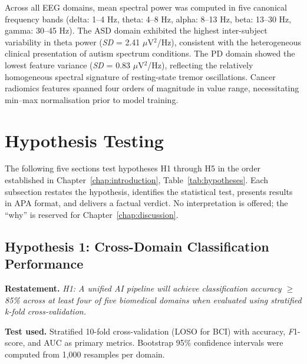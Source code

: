 Across all EEG domains, mean spectral power was computed in five canonical frequency bands (delta: 1--4 Hz, theta: 4--8 Hz, alpha: 8--13 Hz, beta: 13--30 Hz, gamma: 30--45 Hz). The ASD domain exhibited the highest inter-subject variability in theta power (\textit{SD} = 2.41 $\mu$V$^2$/Hz), consistent with the heterogeneous clinical presentation of autism spectrum conditions. The PD domain showed the lowest feature variance (\textit{SD} = 0.83 $\mu$V$^2$/Hz), reflecting the relatively homogeneous spectral signature of resting-state tremor oscillations. Cancer radiomics features spanned four orders of magnitude in value range, necessitating min--max normalisation prior to model training.


\section{Hypothesis Testing}
\label{sec:hypothesis_testing}

The following five sections test hypotheses H1 through H5 in the order established in Chapter~\ref{chap:introduction}, Table~\ref{tab:hypotheses}. Each subsection restates the hypothesis, identifies the statistical test, presents results in APA format, and delivers a factual verdict. No interpretation is offered; the ``why'' is reserved for Chapter~\ref{chap:discussion}.


\subsection{Hypothesis 1: Cross-Domain Classification Performance}
\label{sec:h1_testing}

\textbf{Restatement.} \textit{H1: A unified AI pipeline will achieve classification accuracy $\geq$85\% across at least four of five biomedical domains when evaluated using stratified \textit{k}-fold cross-validation.}

\textbf{Test used.} Stratified 10-fold cross-validation (LOSO for BCI) with accuracy, \textit{F}1-score, and AUC as primary metrics. Bootstrap 95\% confidence intervals were computed from 1,000 resamples per domain.

